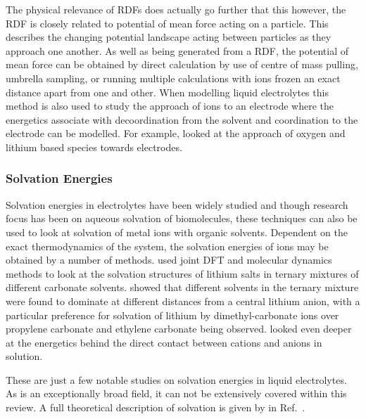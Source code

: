 \documentclass[../main.tex]{subfiles}
\begin{document}
The physical relevance of RDFs does actually go further that this however, the RDF is closely related to potential of mean force acting on a particle. This describes the changing potential landscape acting between particles as they approach one another\cite{frenkel_understanding_2002}. As well as being generated from a RDF, the potential of mean force can be obtained by direct calculation by use of centre of mass pulling, umbrella sampling\cite{lindahl_gromacs_2021}, or running multiple calculations with ions frozen an exact distance apart from one and other. When modelling liquid electrolytes this method is also used to study the approach of ions to an electrode where the energetics associate with decoordination from the solvent and coordination to the electrode can be modelled. For example, \citeauthor{sergeev_electrodeelectrolyte_2017} looked at the approach of oxygen and lithium based species towards electrodes\cite{sergeev_electrodeelectrolyte_2017}.

\subsubsection{Solvation Energies}
Solvation energies in electrolytes have been widely studied and though research focus has been on aqueous solvation of biomolecules, these techniques can also be used to look at solvation of metal ions with organic solvents. Dependent on the exact thermodynamics of the system, the solvation energies of ions may be obtained by a number of methods.\citeauthor{Skarmoutsos_2015} used joint DFT and molecular dynamics methods to look at the solvation structures of lithium salts in ternary mixtures of different carbonate solvents. \cite{Skarmoutsos_2015} \citeauthor{Skarmoutsos_2015} showed that different solvents in the ternary mixture were found to dominate at different distances from a central lithium anion, with a particular preference for solvation of lithium by dimethyl-carbonate ions over propylene carbonate and ethylene carbonate being observed. \citeauthor{Takeuchi_2012} looked even deeper at the energetics behind the direct contact between cations and anions in solution\cite{Takeuchi_2012}.

These are just a few notable studies on solvation energies in liquid electrolytes. As is an exceptionally broad field, it can not be extensively covered within this review. A full theoretical description of solvation is given by \citeauthor{Lazaridis_1998} in Ref.~.
\end{document}

